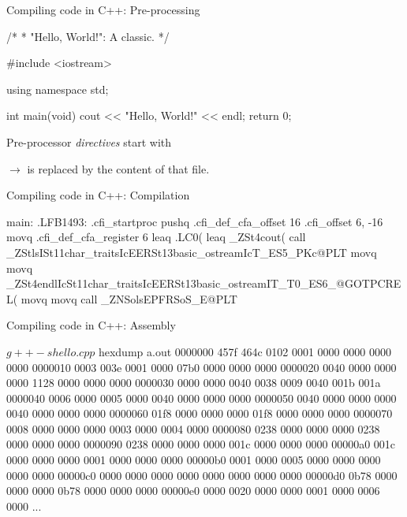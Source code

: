 \documentclass[compress]{beamer}
\begin{document}
\begin{frame}[fragile]{Compiling code in C++: Pre-processing}


\begin{cppcode}
/*
 * "Hello, World!": A classic.
 */

#include <iostream>

using namespace std;

int main(void)
{
    cout << "Hello, World!" << endl;
    return 0;
}
\end{cppcode}

Pre-processor \emph{directives} start with \cpp{#}

$\rightarrow$  is replaced by the content of that file.

\end{frame}

\begin{frame}[fragile]{Compiling code in C++: Compilation}



\begin{asmcode}
main:
.LFB1493:
	.cfi_startproc
	pushq	%
	.cfi_def_cfa_offset 16
	.cfi_offset 6, -16
	movq	%
	.cfi_def_cfa_register 6
	leaq	.LC0(%
	leaq	_ZSt4cout(%
	call	_ZStlsISt11char_traitsIcEERSt13basic_ostreamIcT_ES5_PKc@PLT
	movq	%
	movq	_ZSt4endlIcSt11char_traitsIcEERSt13basic_ostreamIT_T0_ES6_@GOTPCREL(%
	movq	%
	movq	%
	call	_ZNSolsEPFRSoS_E@PLT
\end{asmcode}
\end{frame}

\begin{frame}[fragile]{Compiling code in C++: Assembly}

\begin{shcode}
$ g++ -s hello.cpp
$ hexdump a.out
0000000 457f 464c 0102 0001 0000 0000 0000 0000
0000010 0003 003e 0001 0000 07b0 0000 0000 0000
0000020 0040 0000 0000 0000 1128 0000 0000 0000
0000030 0000 0000 0040 0038 0009 0040 001b 001a
0000040 0006 0000 0005 0000 0040 0000 0000 0000
0000050 0040 0000 0000 0000 0040 0000 0000 0000
0000060 01f8 0000 0000 0000 01f8 0000 0000 0000
0000070 0008 0000 0000 0000 0003 0000 0004 0000
0000080 0238 0000 0000 0000 0238 0000 0000 0000
0000090 0238 0000 0000 0000 001c 0000 0000 0000
00000a0 001c 0000 0000 0000 0001 0000 0000 0000
00000b0 0001 0000 0005 0000 0000 0000 0000 0000
00000c0 0000 0000 0000 0000 0000 0000 0000 0000
00000d0 0b78 0000 0000 0000 0b78 0000 0000 0000
00000e0 0000 0020 0000 0000 0001 0000 0006 0000
...
\end{shcode}
\end{frame}
\end{document}
